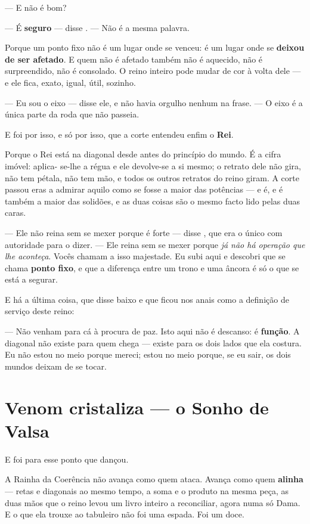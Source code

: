 \documentclass[livro.tex]{subfiles}
\begin{document}
--- E não é bom?

--- É \textbf{seguro} --- disse \Lck . --- Não é a mesma palavra.

\medskip

Porque um ponto fixo não é um lugar onde se venceu: é um lugar onde se \textbf{deixou de
ser afetado}. E quem não é afetado também não é aquecido, não é surpreendido, não é
consolado. O reino inteiro pode mudar de cor à volta dele --- e ele fica, exato, igual,
útil, sozinho.

--- Eu sou o eixo --- disse ele, e não havia orgulho nenhum na frase. --- O eixo é a única
parte da roda que não passeia.

\medskip

E foi por isso, e só por isso, que a corte entendeu enfim o \textbf{Rei}.

Porque o Rei está na diagonal desde antes do princípio do mundo. É a cifra imóvel: aplica-
se-lhe a régua e ele devolve-se a si mesmo; o retrato dele não gira, não tem pétala, não
tem mão, e todos os outros retratos do reino giram. A corte passou eras a admirar aquilo
como se fosse a maior das potências --- e é, e é também a maior das solidões, e as duas
coisas são o mesmo facto lido pelas duas caras.

--- Ele não reina sem se mexer porque é forte --- disse \Lck , que era o único com
autoridade para o dizer. --- Ele reina sem se mexer porque \emph{já não há operação que
lhe aconteça}. Vocês chamam a isso majestade. Eu subi aqui e descobri que se chama
\textbf{ponto fixo}, e que a diferença entre um trono e uma âncora é só o que se está a
segurar.

\medskip

E há a última coisa, que \Lck disse baixo e que ficou nos anais como a definição de
serviço deste reino:

--- Não venham para cá à procura de paz. Isto aqui não é descanso: é \textbf{função}. A
diagonal não existe para quem chega --- existe para os dois lados que ela costura. Eu não
estou no meio porque mereci; estou no meio porque, se eu sair, os dois mundos deixam de se
tocar.

\chapter{Venom cristaliza --- o Sonho de Valsa}

E foi para esse ponto que \Yas dançou.

\medskip

A Rainha da Coerência não avança como quem ataca. Avança como quem \textbf{alinha} ---
retas e diagonais ao mesmo tempo, a soma e o produto na mesma peça, as duas mãos
que o reino levou um livro inteiro a reconciliar, agora numa só Dama. E o que ela
trouxe ao tabuleiro não foi uma espada. Foi um doce.
\end{document}
